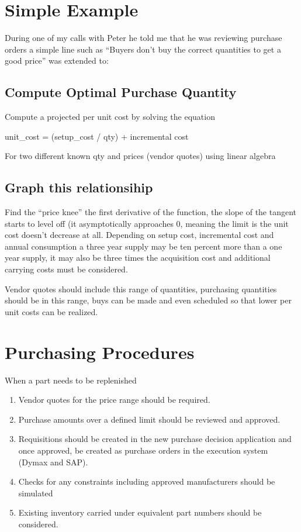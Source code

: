 \documentclass[letterpaper,10pt,english]{sphinxmanual}
\begin{document}
\section{Simple Example}
\label{FutureState:simple-example}
During one of my calls with Peter he told me that he was reviewing
purchase orders a simple line such as ``Buyers don't buy the correct
quantities to get a good price'' was extended to:


\subsection{Compute Optimal Purchase Quantity}
\label{FutureState:compute-optimal-purchase-quantity}
Compute a projected per unit cost by solving the equation

unit\_cost = (setup\_cost / qty) + incremental cost

For two different known qty and prices (vendor quotes) using linear
algebra


\subsection{Graph this relationsihip}
\label{FutureState:graph-this-relationsihip}
Find the ``price knee'' the first derivative of the function, the slope of
the tangent starts to level off (it asymptotically approaches 0, meaning
the limit is the unit cost doesn't decrease at all. Depending on setup
cost, incremental cost and annual consumption a three year supply may be
ten percent more than a one year supply, it may also be three times the
acquisition cost and additional carrying costs must be considered.

Vendor quotes should include this range of quantities, purchasing
quantities should be in this range, buys can be made and even scheduled
so that lower per unit costs can be realized.


\section{Purchasing Procedures}
\label{FutureState:purchasing-procedures}
When a part needs to be replenished
\begin{enumerate}
\item {} 
Vendor quotes for the price range should be required.

\item {} 
Purchase amounts over a defined limit should be reviewed and
approved.

\item {} 
Requisitions should be created in the new purchase decision
application and once approved, be created as purchase orders in the
execution system (Dymax and SAP).

\item {} 
Checks for any constraints including approved manufacturers should be
simulated

\item {} 
Existing inventory carried under equivalent part numbers should be
considered.

\end{enumerate}
\end{document}
